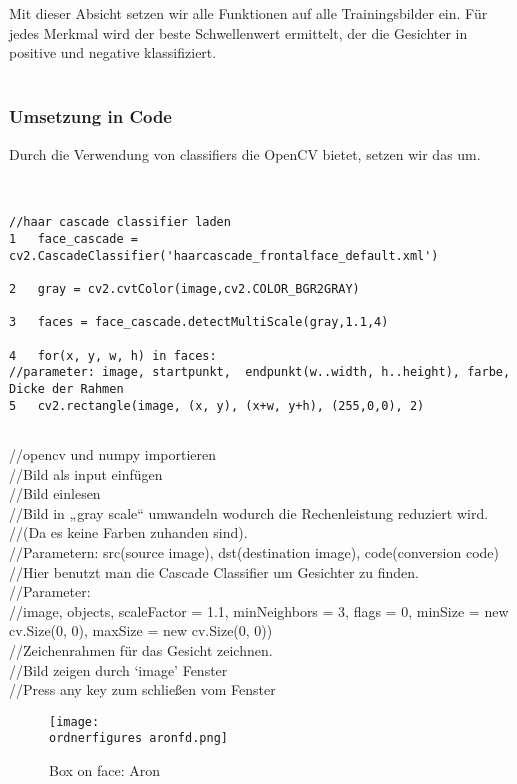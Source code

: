 Mit dieser Absicht setzen wir alle Funktionen auf alle Trainingsbilder ein. Für jedes Merkmal wird der beste Schwellenwert ermittelt, der die Gesichter in positive und negative klassifiziert.\\\\

\subsubsection{Umsetzung in Code}

Durch die Verwendung von classifiers die OpenCV bietet, setzen wir das um. \\\\
\begin{lstlisting}

//haar cascade classifier laden 
1	face_cascade = cv2.CascadeClassifier('haarcascade_frontalface_default.xml')

2	gray = cv2.cvtColor(image,cv2.COLOR_BGR2GRAY)

3	faces = face_cascade.detectMultiScale(gray,1.1,4)

4	for(x, y, w, h) in faces:
//parameter: image, startpunkt,  endpunkt(w..width, h..height), farbe, Dicke der Rahmen
5	cv2.rectangle(image, (x, y), (x+w, y+h), (255,0,0), 2) 


\end{lstlisting}
 //opencv und numpy importieren \\
//Bild als input einfügen\\
//Bild einlesen\\
//Bild in „gray scale“ umwandeln wodurch die Rechenleistung reduziert wird.
//(Da es keine Farben zuhanden sind).\\
//Parametern: src(source image), dst(destination image), code(conversion code)\\
//Hier benutzt man die Cascade Classifier um Gesichter zu finden.\\
//Parameter: \\
//image, objects, scaleFactor = 1.1, minNeighbors = 3, flags = 0, minSize = new cv.Size(0, 0), maxSize = new cv.Size(0, 0)) \\ 
//Zeichenrahmen für das Gesicht zeichnen.\\
//Bild zeigen durch ‘image’ Fenster \\
//Press any key zum schließen vom Fenster\\
\begin{figure}[H]
	\texttt{[image: \\ordnerfigures aronfd.png]}
	\caption{Box on face: Aron}
	\label{fig:aron}
\end{figure}

